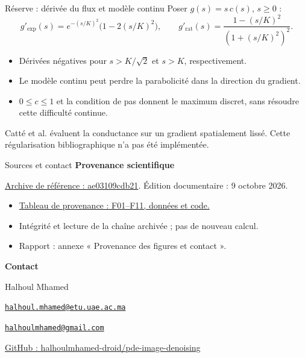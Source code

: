 \documentclass[aspectratio=169,11pt]{beamer}
\newcommand{\smallgap}{\vspace{0.18cm}}
\begin{document}
\begin{frame}[label=reserve-continu]{Réserve : dérivée du flux et modèle continu}
  Poser $g(s)=s\,c(s)$, $s\geq0$ :
  \[
    g'_{\exp}(s)=e^{-(s/K)^2}\bigl(1-2(s/K)^2\bigr),
    \qquad
    g'_{\mathrm{rat}}(s)=\frac{1-(s/K)^2}{(1+(s/K)^2)^2}.
  \]
  \begin{itemize}
    \item Dérivées négatives pour $s>K/\sqrt2$ et $s>K$, respectivement.
    \item Le modèle continu peut perdre la parabolicité dans la direction
      du gradient.
    \item $0\leq c\leq1$ et la condition de pas donnent le maximum discret,
      sans résoudre cette difficulté continue.
  \end{itemize}
  \smallgap
  Catté et al. évaluent la conductance sur un gradient spatialement lissé.
  Cette régularisation bibliographique n'a pas été implémentée.
\end{frame}

\begin{frame}[label=sources-contact,plain,noframenumbering]{Sources et contact}
  \textbf{Provenance scientifique}\par
  \href{https://github.com/halhoulmhamed-droid/pde-image-denoising/commit/ae03109cdb2150b760e5a4b8bcffb56bba1b98e0}{Archive de référence : ae03109cdb21}.
  Édition documentaire : 9 octobre 2026.
  \smallgap
  \begin{itemize}
    \item \href{https://github.com/halhoulmhamed-droid/pde-image-denoising/blob/main/docs/figure_provenance.md}{Tableau de provenance : F01--F11, données et code.}
    \item Intégrité et lecture de la chaîne archivée ; pas de nouveau calcul.
    \item Rapport : annexe « Provenance des figures et contact ».
  \end{itemize}
  \smallgap
  \textbf{Contact}\par
  Halhoul Mhamed\par
  \href{mailto:halhoul.mhamed@etu.uae.ac.ma}{\nolinkurl{halhoul.mhamed@etu.uae.ac.ma}}\par
  \href{mailto:halhoulmhamed@gmail.com}{\nolinkurl{halhoulmhamed@gmail.com}}\par
  \smallgap
  \href{https://github.com/halhoulmhamed-droid/pde-image-denoising}{GitHub : halhoulmhamed-droid/pde-image-denoising}
\end{frame}
\end{document}
